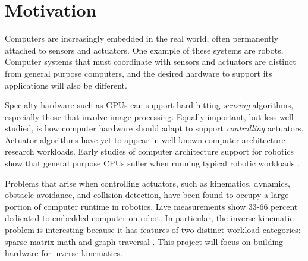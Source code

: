 \section{Motivation}

Computers are increasingly embedded in the real world, often permanently attached to sensors and actuators. One example of these systems are robots. Computer systems that must coordinate with sensors and actuators are distinct from general purpose computers, and the desired hardware to support its applications will also be different.

Specialty hardware such as GPUs can support hard-hitting \emph{sensing} algorithms, especially those that involve image processing. Equally important, but less well studied, is how computer hardware should adapt to support \emph{controlling} actuators. Actuator algorithms have yet to appear in well known computer architecture research workloads. Early studies of computer architecture support for robotics show that general purpose CPUs suffer when running typical robotic workloads \cite{Caselli}.

Problems that arise when controlling actuators, such as kinematics, dynamics, obstacle avoidance, and collision detection, have been found to occupy a large portion of computer runtime in robotics. Live measurements show 33-66 percent dedicated to embedded computer on robot. In particular, the inverse kinematic problem is interesting because it has features of two distinct workload categories: sparse matrix math and graph traversal \cite{dwarfs}. This project will focus on building hardware for inverse kinematics.

